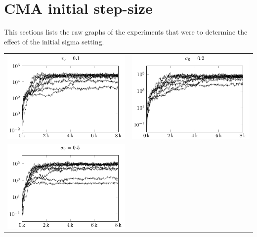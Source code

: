 \section{CMA initial step-size \label{appendixCMAInitialSigma}}

This sections lists the raw graphs of the experiments that were
to determine the effect of the initial sigma setting. 

\begin{tabular}{@{}l@{}l@{}}
\includegraphics[scale=1]{plots/cma_initial_sigma_0_1} &
\includegraphics[scale=1]{plots/cma_initial_sigma_0_2}\\
\includegraphics[scale=1]{plots/cma_initial_sigma_0_5} &

\end{tabular}
